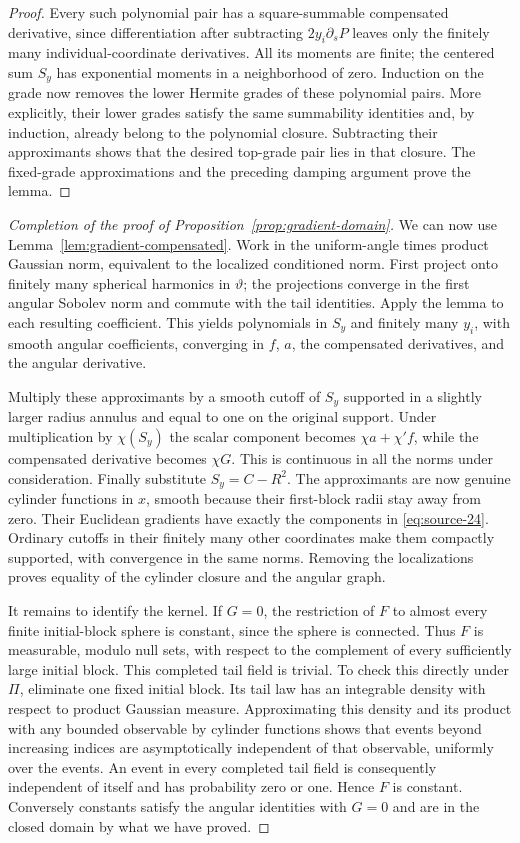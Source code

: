 \begin{proof}
Every such polynomial pair has a square-summable compensated derivative,
since differentiation after subtracting $2y_i\partial_s P$ leaves only
the finitely many individual-coordinate derivatives. All its moments
are finite; the centered sum $S_y$ has exponential moments in a
neighborhood of zero. Induction on the grade now removes the lower
Hermite grades of these polynomial pairs. More explicitly, their lower
grades satisfy the same summability identities and, by induction,
already belong to the polynomial closure. Subtracting their
approximants shows that the desired top-grade pair lies in that closure.
The fixed-grade approximations and the preceding damping argument prove
the lemma.
\end{proof}

\begin{proof}[Completion of the proof of Proposition~\ref{prop:gradient-domain}]
We can now use Lemma~\ref{lem:gradient-compensated}. Work in the
uniform-angle times product Gaussian norm, equivalent to the localized
conditioned norm. First project onto finitely many spherical harmonics
in $\vartheta$; the projections
converge in the first angular Sobolev norm and commute with the tail
identities. Apply the lemma to each resulting coefficient. This yields
polynomials in $S_y$ and finitely many $y_i$, with smooth angular
coefficients, converging in $f$, $a$, the compensated derivatives, and
the angular derivative.

Multiply these approximants by a smooth cutoff of $S_y$ supported in
a slightly larger radius annulus and equal to one on the original
support. Under multiplication by $\chi(S_y)$ the scalar component
becomes $\chi a+\chi'f$, while the compensated derivative becomes
$\chi G$. This is continuous in all the norms under consideration.
Finally substitute $S_y=C-R^2$. The approximants are now genuine
cylinder functions in $x$, smooth because their first-block radii stay
away from zero. Their Euclidean gradients have exactly the components
in \eqref{eq:source-24}. Ordinary cutoffs in their finitely many other
coordinates make them compactly supported, with convergence in the
same norms. Removing the localizations proves equality of the cylinder
closure and the angular graph.

It remains to identify the kernel. If $G=0$, the restriction of $F$ to
almost every finite initial-block sphere is constant, since the sphere
is connected. Thus $F$ is measurable, modulo null sets, with respect to
the complement of every sufficiently large initial block. This
completed tail field is trivial. To check this directly under $\Pi$,
eliminate one fixed initial block. Its tail law has an integrable
density with respect to product Gaussian measure. Approximating this
density and its product with any bounded observable by cylinder
functions shows that events beyond increasing indices are
asymptotically independent of that observable, uniformly over the
events. An event in every completed tail field is consequently
independent of itself and has probability zero or one. Hence $F$ is
constant. Conversely constants satisfy the angular identities with
$G=0$ and are in the closed domain by what we have proved.


\end{proof}
